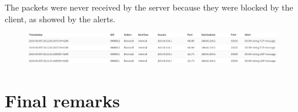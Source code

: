 \documentclass[draft]{homework}
\begin{document}
    The packets were never received by the server because they were blocked by the client, as showed by the alerts.
    \begin{figure}[H]
        \centering
        \includegraphics[width=\linewidth]{images/proof}
        \label{fig:proof}
    \end{figure}
    
    
    \section{Final remarks}
\end{document}
